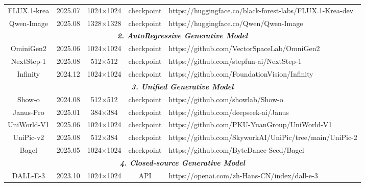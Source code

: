 \begin{table}[t]
{\begin{tabular}{cc|ccl}
        \multicolumn{1}{c|}{FLUX.1-krea} & 2025.07 & \multicolumn{1}{c|}{1024$\times$1024} & \multicolumn{1}{c|}{checkpoint} & https://huggingface.co/black-forest-labs/FLUX.1-Krea-dev \\
        \multicolumn{1}{c|}{Qwen-Image} & 2025.08 & \multicolumn{1}{c|}{1328$\times$1328} & \multicolumn{1}{c|}{checkpoint} & https://huggingface.co/Qwen/Qwen-Image \\ 
        \midrule
        \multicolumn{5}{c}{\textit{\textbf{2. AutoRegressive Generative Model}}} \\ 
        \midrule
        \multicolumn{1}{c|}{OminiGen2} & 2025.06 & \multicolumn{1}{c|}{1024$\times$1024} & \multicolumn{1}{c|}{checkpoint} & https://github.com/VectorSpaceLab/OmniGen2 \\
        \multicolumn{1}{c|}{NextStep-1} & 2025.08 & \multicolumn{1}{c|}{512$\times$512} & \multicolumn{1}{c|}{checkpoint} & https://github.com/stepfun-ai/NextStep-1 \\
        \multicolumn{1}{c|}{Infinity} & 2024.12 & \multicolumn{1}{c|}{1024$\times$1024} & \multicolumn{1}{c|}{checkpoint} & https://github.com/FoundationVision/Infinity \\ 
        \midrule
        \multicolumn{5}{c}{\textit{\textbf{3. Unified Generative Model}}} \\ 
        \midrule
        \multicolumn{1}{c|}{Show-o} & 2024.08 & \multicolumn{1}{c|}{512$\times$512} & \multicolumn{1}{c|}{checkpoint} & https://github.com/showlab/Show-o \\
        \multicolumn{1}{c|}{Janus-Pro} & 2025.01 & \multicolumn{1}{c|}{384$\times$384} & \multicolumn{1}{c|}{checkpoint} & https://github.com/deepseek-ai/Janus \\
        \multicolumn{1}{c|}{UniWorld-V1} & 2025.06 & \multicolumn{1}{c|}{1024$\times$1024} & \multicolumn{1}{c|}{checkpoint} & https://github.com/PKU-YuanGroup/UniWorld-V1 \\
        \multicolumn{1}{c|}{UniPic-v2} & 2025.08 & \multicolumn{1}{c|}{512$\times$384} & \multicolumn{1}{c|}{checkpoint} & https://github.com/SkyworkAI/UniPic/tree/main/UniPic-2 \\
        \multicolumn{1}{c|}{Bagel} & 2025.05 & \multicolumn{1}{c|}{1024$\times$1024} & \multicolumn{1}{c|}{checkpoint} & https://github.com/ByteDance-Seed/Bagel \\ 
        \midrule
        \multicolumn{5}{c}{\textit{\textbf{4. Closed-source Generative Model}}} \\ 
        \midrule
        \multicolumn{1}{c|}{DALL-E-3} & 2023.10 & \multicolumn{1}{c|}{1024$\times$1024} & \multicolumn{1}{c|}{API} & https://openai.com/zh-Hans-CN/index/dall-e-3 \\

\end{tabular}}
\end{table}
